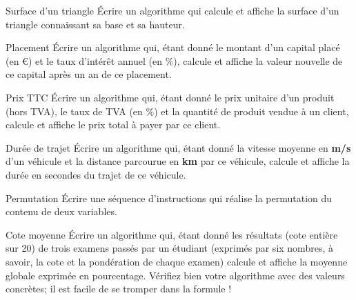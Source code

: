 \begin{Exercice}{Surface d'un triangle}
	Écrire un algorithme qui calcule et affiche la surface
	d'un triangle connaissant sa base et sa hauteur.
	
	\begin{Solution}
	\end{Solution}
\end{Exercice}

\begin{Exercice}{Placement}
	Écrire un algorithme qui, étant donné le montant d’un capital placé (en
	€) et le taux d’intérêt annuel (en \%), calcule et affiche la valeur
	nouvelle de ce capital après un an de ce placement.
\end{Exercice}

\begin{Exercice}{Prix TTC}
	Écrire un algorithme qui, étant donné le prix unitaire d’un produit
	(hors TVA), le taux de TVA (en \%) et la quantité de produit vendue à
	un client, calcule et affiche le prix total à payer par ce client.
\end{Exercice}

\begin{Exercice}{Durée de trajet}
	Écrire un algorithme qui, étant donné la vitesse moyenne en \textbf{m/s}
	d’un véhicule et la distance parcourue en \textbf{km} par ce véhicule,
	calcule et affiche la durée en secondes du trajet de ce véhicule.
\end{Exercice}

\begin{Exercice}{Permutation}
	Écrire une séquence d’instructions qui réalise la permutation du contenu
	de deux variables.
\end{Exercice}

\begin{Exercice}{Cote moyenne}
	Écrire un algorithme qui, étant donné les résultats (cote entière sur
	20) de trois examens passés par un étudiant (exprimés par six nombres,
	à savoir, la cote et la pondération de chaque examen) calcule et
	affiche la moyenne globale exprimée en pourcentage. Vérifiez bien votre
	algorithme avec des valeurs concrètes; il est facile de se tromper dans
	la formule !
\end{Exercice}

